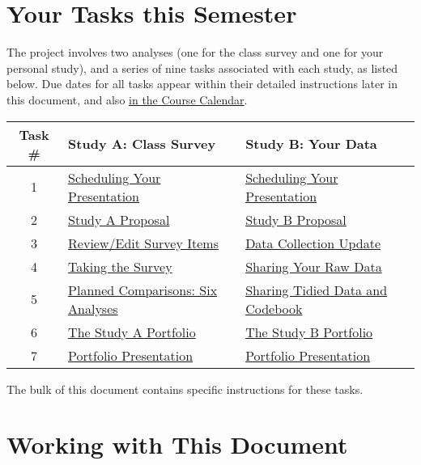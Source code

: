 \documentclass[]{book}
\begin{document}
\hypertarget{your-tasks-this-semester}{%
\section*{Your Tasks this Semester}\label{your-tasks-this-semester}}

The project involves two analyses (one for the class survey and one for your personal study), and a series of nine tasks associated with each study, as listed below. Due dates for all tasks appear within their detailed instructions later in this document, and also \href{https://github.com/THOMASELOVE/2019-431/blob/master/calendar.md}{in the Course Calendar}.

\begin{longtable}[]{@{}cll@{}}
\toprule
Task \# & Study A: Class Survey & Study B: Your Data\tabularnewline
\midrule
\endhead
1 & \protect\hyperlink{task1}{Scheduling Your Presentation} & \protect\hyperlink{task1}{Scheduling Your Presentation}\tabularnewline
2 & \protect\hyperlink{task2a}{Study A Proposal} & \protect\hyperlink{task2b}{Study B Proposal}\tabularnewline
3 & \protect\hyperlink{task3a}{Review/Edit Survey Items} & \protect\hyperlink{task3b}{Data Collection Update}\tabularnewline
4 & \protect\hyperlink{task4a}{Taking the Survey} & \protect\hyperlink{task4b}{Sharing Your Raw Data}\tabularnewline
5 & \protect\hyperlink{task5a}{Planned Comparisons: Six Analyses} & \protect\hyperlink{task5b}{Sharing Tidied Data and Codebook}\tabularnewline
6 & \protect\hyperlink{task6a}{The Study A Portfolio} & \protect\hyperlink{task6b}{The Study B Portfolio}\tabularnewline
7 & \protect\hyperlink{task7}{Portfolio Presentation} & \protect\hyperlink{task7}{Portfolio Presentation}\tabularnewline
\bottomrule
\end{longtable}

The bulk of this document contains specific instructions for these tasks.

\hypertarget{working-with-this-document}{%
\section*{Working with This Document}\label{working-with-this-document}}
\end{document}
